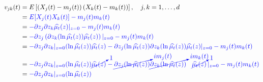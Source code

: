 \documentclass[a4paper,11pt]{article}
\begin{document}
{ \small
        \begin{align*}
            v_{j k}(t) & =E\left[\left(X_{j}(t)-m_{j}(t)\right)\left(X_{k}(t)-m_{k}(t)\right)\right], \quad j, k=1, \ldots, d                                                                                                                                                                                                                                      \\
                       & = \textcolor{blue}{ E[X_{j}(t)X_{k}(t)] - m_{j}(t)m_{k}(t)}                                                                                                                                                                                                                                                                               \\
                       & = \textcolor{blue}{  -\partial z_{j} \partial z_{k} \widehat{\mu_{t}}(z)|_{z=0} - m_{j}(t)m_{k}(t)}                                                                                                                                                                                                                                       \\
                       & = \textcolor{blue}{  -\partial z_{j} \left( \partial z_{k} (\ln \widehat{\mu_{t}}(z)) \widehat{\mu_{t}}(z) \right) |_{z=0} - m_{j}(t)m_{k}(t)}                                                                                                                                                                                            \\
                       & = \textcolor{blue}{  -\partial z_{j} \partial z_{k}|_{z=0} (\ln \widehat{\mu_{t}}(z)) \widehat{\mu_{t}}(z)   -\partial z_{j}( \ln\widehat{\mu_{t}}(z) )\partial z_{k}( \ln\widehat{\mu_{t}}(z) )\widehat{\mu_{t}}(z)|_{z=0} - m_{j}(t)m_{k}(t)}                                                                                           \\
                       & = \textcolor{blue}{  -\partial z_{j} \partial z_{k}|_{z=0} (\ln \widehat{\mu_{t}}(z)) \cancelto{1}{\widehat{\mu_{t}}(z)}   -\cancelto{i m_{j}(t)}{\partial z_{j}( \ln\widehat{\mu_{t}}(z) )}\cancelto{im_{k}(t)}{\partial z_{k}( \ln\widehat{\mu_{t}}(z) )} \hspace{0.3cm}\cancelto{1}{\widehat{\mu_{t}}(z)}\,|_{z=0} - m_{j}(t)m_{k}(t)} \\
                       & = \textcolor{blue}{  -\partial z_{j} \partial z_{k}|_{z=0} (\ln \widehat{\mu_{t}}(z)) }
        \end{align*}
    }
\end{document}
